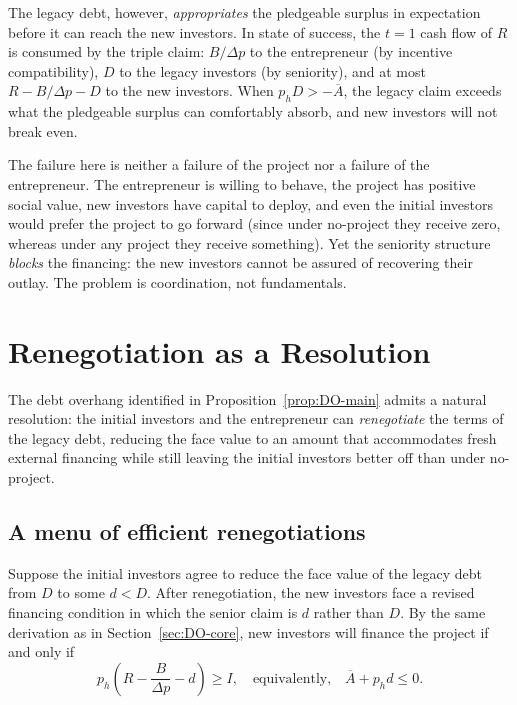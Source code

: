 \documentclass[11pt,a4paper,oneside]{book}
\def\leq{\leqslant}
\def\geq{\geqslant}
\theoremstyle{plain}
\theoremstyle{definition}
\theoremstyle{remark}
\numberwithin{equation}{chapter}
\begin{document}
The legacy debt, however, \emph{appropriates} the pledgeable surplus in expectation before it can reach the new investors.
In state of success, the $t=1$ cash flow of $R$ is consumed by the triple claim: $B/\Delta p$ to the entrepreneur (by incentive compatibility), $D$ to the legacy investors (by seniority), and at most $R - B/\Delta p - D$ to the new investors.
When $p_h D > -\overline{A}$, the legacy claim exceeds what the pledgeable surplus can comfortably absorb, and new investors will not break even.

The failure here is neither a failure of the project nor a failure of the entrepreneur.
The entrepreneur is willing to behave, the project has positive social value, new investors have capital to deploy, and even the initial investors would prefer the project to go forward (since under no-project they receive zero, whereas under any project they receive something).
Yet the seniority structure \emph{blocks} the financing: the new investors cannot be assured of recovering their outlay.
The problem is coordination, not fundamentals.

\section{Renegotiation as a Resolution}
\label{sec:DO-renegotiation}

The debt overhang identified in Proposition~\ref{prop:DO-main} admits a natural resolution: the initial investors and the entrepreneur can \emph{renegotiate} the terms of the legacy debt, reducing the face value to an amount that accommodates fresh external financing while still leaving the initial investors better off than under no-project.

\subsection{A menu of efficient renegotiations}

Suppose the initial investors agree to reduce the face value of the legacy debt from $D$ to some $d < D$.
After renegotiation, the new investors face a revised financing condition in which the senior claim is $d$ rather than $D$.
By the same derivation as in Section~\ref{sec:DO-core}, new investors will finance the project if and only if
\begin{equation}\label{eq:DO-IR-renegotiated}
  p_h \left( R - \frac{B}{\Delta p} - d \right) \geq I,
  \quad \text{equivalently,} \quad
  \overline{A} + p_h d \leq 0.
\end{equation}
\end{document}
